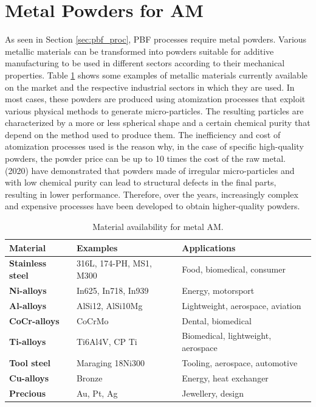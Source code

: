 
\section{Metal Powders for AM} 
\label{sec:metalpowders}
As seen in Section \ref{sec:pbf_proc}, PBF processes require metal powders. Various metallic materials can be transformed into powders suitable for additive manufacturing to be used in different sectors according to their mechanical properties. Table \ref{table:materialAMmetal} shows some examples of metallic materials currently available on the market and the respective industrial sectors in which they are used. In most cases, these powders are produced using atomization processes that exploit various physical methods to generate micro-particles. The resulting particles are characterized by a more or less spherical shape and a certain chemical purity that depend on the method used to produce them. The inefficiency and cost of atomization processes used is the reason why, in the case of specific high-quality powders, the powder price can be up to 10 times the cost of the raw metal. \citeauthor{deng_origin_2020} (2020) have demonstrated that powders made of irregular micro-particles and with low chemical purity can lead to structural defects in the final parts, resulting in lower performance. Therefore, over the years, increasingly complex and expensive processes have been developed to obtain higher-quality powders.
\begin{table}
\centering 
\small
    \begin{tabular}{|l l l|}
    \hline
    \rowcolor{bluepoli!40}
    \textbf{Material} & \textbf{Examples} & \textbf{Applications}\\
    \hline \hline
    \textbf{Stainless steel} & 316L, 174-PH, MS1, M300 & Food, biomedical, consumer \T\B\\
    \textbf{Ni-alloys} & In625, In718, In939 & Energy, motorsport\T\B\\
    \textbf{Al-alloys} & AlSi12, AlSi10Mg & Lightweight, aerospace, aviation\T\B\\
    \textbf{CoCr-alloys} & CoCrMo & Dental, biomedical\T\B\\
    \textbf{Ti-alloys} & Ti6Al4V, CP Ti & Biomedical, lightweight, aerospace\T\B\\
    \textbf{Tool steel} & Maraging 18Ni300 & Tooling, aerospace, automotive\T\B\\
    \textbf{Cu-alloys} & Bronze & Energy, heat exchanger\T\B\\
    \textbf{Precious} & Au, Pt, Ag & Jewellery, design\T\B\\
    \hline
    \end{tabular}
    \\[10pt]
    \caption{Material availability for metal AM.}
    \label{table:materialAMmetal}
\end{table}
